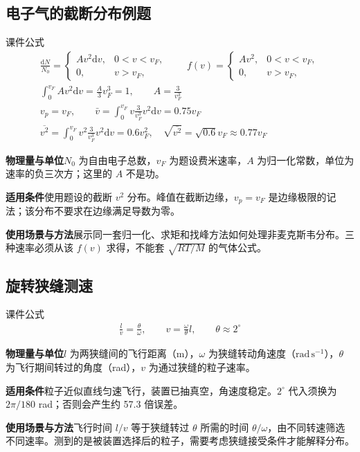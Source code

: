 \documentclass[UTF8,fontset=none,zihao=-4,a4paper]{ctexart}
\newcommand{\explain}[3]{\par\noindent\textbf{物理量与单位}\quad #1\par
\noindent\textbf{适用条件}\quad #2\par
\noindent\textbf{使用场景与方法}\quad #3\par}
\begin{document}
\par\noindent\begin{minipage}{\linewidth}
\subsection{电子气的截断分布例题}
\begin{infobox}[breakable=false]{课件公式}
\begin{gather*}\frac{\mathrm dN}{N_0}=\begin{cases}Av^2\mathrm dv,&0<v<v_F,\\0,&v>v_F,\end{cases}\qquad f(v)=\begin{cases}Av^2,&0<v<v_F,\\0,&v>v_F,\end{cases}\\\int_0^{v_F}Av^2\mathrm dv=\frac A3v_F^3=1,\qquad A=\frac3{v_F^3}\\v_p=v_F,\qquad\bar v=\int_0^{v_F}v\frac3{v_F^3}v^2\mathrm dv=0.75v_F\\\overline{v^2}=\int_0^{v_F}v^2\frac3{v_F^3}v^2\mathrm dv=0.6v_F^2,\quad\sqrt{\overline{v^2}}=\sqrt{0.6}v_F\approx0.77v_F\end{gather*}
\end{infobox}
\end{minipage}\par
\explain{$N_0$ 为自由电子总数，$v_F$ 为题设费米速率，$A$ 为归一化常数，单位为速率的负三次方；这里的 $A$ 不是功。}{使用题设的截断 $v^2$ 分布。峰值在截断边缘，$v_p=v_F$ 是边缘极限的记法；该分布不要求在边缘满足导数为零。}{展示同一套归一化、求矩和找峰方法如何处理非麦克斯韦分布。三种速率必须从该 $f(v)$ 求得，不能套 $\sqrt{RT/M}$ 的气体公式。}


\par\noindent\begin{minipage}{\linewidth}
\subsection{旋转狭缝测速}
\begin{infobox}[breakable=false]{课件公式}
\begin{gather*}\frac lv=\frac\theta\omega,\qquad v=\frac\omega\theta l,\qquad\theta\approx2^\circ\end{gather*}
\end{infobox}
\end{minipage}\par
\explain{$l$ 为两狭缝间的飞行距离（m），$\omega$ 为狭缝转动角速度（$\mathrm{rad\,s^{-1}}$），$\theta$ 为飞行期间转过的角度（rad），$v$ 为通过狭缝的粒子速率。}{粒子近似直线匀速飞行，装置已抽真空，角速度稳定。$2^\circ$ 代入须换为 $2\pi/180$ rad；否则会产生约 57.3 倍误差。}{飞行时间 $l/v$ 等于狭缝转过 $\theta$ 所需的时间 $\theta/\omega$，由不同转速筛选不同速率。测到的是被装置选择后的粒子，需要考虑狭缝接受条件才能解释分布。}
\end{document}
